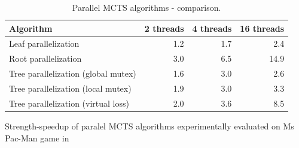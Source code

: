 \begin{table}[h]
\label{tab_parallel_mcts_comparison}
\begin{center}
\begin{tabular}{|l|rrr|}
\hline Algorithm & 2 threads & 4 threads & 16 threads\\
\hline Leaf parallelization & 1.2 & 1.7 & 2.4\\
\hline Root parallelization & 3.0 & 6.5 & 14.9\\
\hline Tree parallelization (global mutex) & 1.6 & 3.0 & 2.6\\
\hline Tree parallelization (local mutex) & 1.9 & 3.0 & 3.3\\
\hline Tree parallelization (virtual loss) & 2.0 & 3.6 & 8.5\\
\hline
\end{tabular}
\end{center}
\caption{\footnotesize Parallel MCTS algorithms - comparison.}{\footnotesize Strength-speedup
of paralel MCTS algorithms experimentally evaluated on Ms Pac-Man game in \cite{Chaslot2008}}
\end{table}










